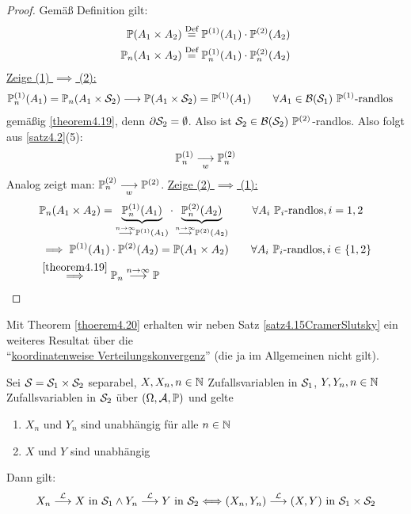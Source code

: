 \begin{proof}
	Gemäß Definition gilt:
	\begin{align*}
		\P(A_1\times A_2)&\stackeq{\text{Def}}\P^{(1)}(A_1)\cdot\P^{(2)}(A_2)\\
		\P_n(A_1\times A_2)&\stackeq{\text{Def}}\P_n^{(1)}(A_1)\cdot\P_n^{(2)}(A_2)\\
	\end{align*}
	\underline{Zeige (1) $\implies$ (2):}
	\begin{align*}
		\P_n^{(1)}(A_1)&=\P_n(A_1\times\S_2)\stackrel{}{\longrightarrow}\P(A_1\times\S_2)=\P^{(1)}(A_1)
		\qquad\forall A_1\in\B(\S_1)~\P^{(1)}\text{-randlos}
	\end{align*}
	gemäßig \ref{theorem4.19}, denn $\partial\S_2=\emptyset$. 
	Also ist $\S_2\in\B(\S_2)~\P^{(2)}$-randlos. 
	Also folgt aus \ref{satz4.2}(5):
	\begin{align*}
		\P_n^{(1)}\stackrelnew{w}{}{\longrightarrow}\P_n^{(2)}
	\end{align*}
	Analog zeigt man: 
	$\P_n^{(2)}\stackrelnew{w}{}{\longrightarrow}\P^{(2)}$.\nl
	\underline{Zeige (2) $\implies$ (1):}
	\begin{align*}
		&\P_n(A_1\times A_2)=\underbrace{\P_n^{(1)}(A_1)}_{\stackrel{n\to\infty}{\longrightarrow}\P^{(1)}(A_1)}\cdot\underbrace{\P_n^{(2)}(A_2)}_{\stackrel{n\to\infty}{\longrightarrow}\P^{(2)}(A_2)}\qquad\forall A_i~\P_i\text{-randlos},i=1,2\\
		&\implies
		\P^{(1)}(A_1)\cdot\P^{(2)}(A_2)=\P(A_1\times A_2)\qquad\forall A_i~\P_i\text{-randlos},i\in\lbrace1,2\rbrace\\
		&\stackrel{\ref{theorem4.19}}{\implies}\P_n\stackrel{n\to\infty}{\longrightarrow}\P
	\end{align*}
\end{proof}

Mit Theorem \ref{thoerem4.20} erhalten wir neben Satz \ref{satz4.15CramerSlutsky} ein weiteres Resultat über die\\ ``\ul{koordinatenweise Verteilungskonvergenz}'' (die ja im Allgemeinen nicht gilt).

\begin{satz}\label{satz4.21}
	Sei $\S=\S_1\times\S_2$ separabel, $X,X_n,n\in\N$ Zufallsvariablen in $\S_1$, $Y,Y_n,n\in\N$ Zufallsvariablen in $\S_2$ über $(\Omega,\A,\P)$ und gelte
	\begin{enumerate}
		\item $X_n$ und $Y_n$ sind unabhängig für alle $n\in\N$
		\item $X$ und $Y$ sind unabhängig
	\end{enumerate}
	Dann gilt:
	\begin{align*}
		X_n\stackrel{\L}{\longrightarrow} X\text{ in }\S_1\wedge Y_n\stackrel{\L}{\longrightarrow} Y\text{ in }\S_2
		\Longleftrightarrow (X_n,Y_n)\stackrel{\L}{\longrightarrow}(X,Y)\text{ in }\S_1\times\S_2
	\end{align*}
\end{satz}

